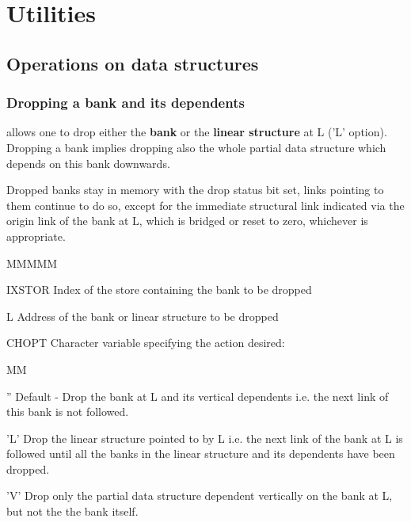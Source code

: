 \chapter{Utilities}
\section{Operations on data structures}
\subsection{Dropping a bank and its dependents}
\par {} allows one to drop either the {\bf bank}
or the {\bf linear structure} at L ('L' option).
Dropping a bank implies dropping also the whole partial
data structure which depends on this bank downwards.
\par Dropped banks stay in memory with the drop status bit set,
links pointing to them continue to do so,
except for the immediate structural link indicated via the
origin link of the bank at L, which is bridged or reset to zero,
whichever is appropriate.
\Idesc
\begin{DL}{MMMMM}
\item[IXSTOR]Index of the store containing the bank to be dropped
\item[L]Address of the bank or linear structure to be dropped
\item[CHOPT]Character variable specifying the action desired:
\begin{DL}{MM}
\item['']Default - Drop the bank at L and its vertical dependents
i.e. the next link of this bank is not followed.
\item['L']Drop the linear structure pointed to by L
i.e. the next link of the bank at L is followed until
all the banks in the linear structure and its dependents have been
dropped.
\item['V']Drop only the partial data structure
dependent vertically on the bank at L, but not the the bank itself.
\end{DL}
\end{DL}
